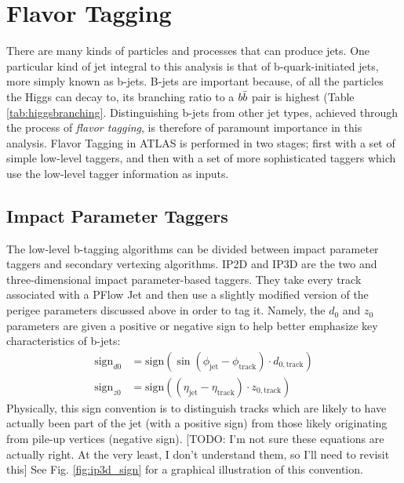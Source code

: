 
    \FloatBarrier
    \section{Flavor Tagging}
        
        There are many kinds of particles and processes that can produce jets.
        One particular kind of jet integral to this analysis is that of b-quark-initiated jets,
            more simply known as b-jets.
        B-jets are important because, of all the particles the Higgs can decay to,
            its branching ratio to a $b \bar{b}$ pair is highest (Table \ref{tab:higgsbranching}.
        Distinguishing b-jets from other jet types,
            achieved through the process of \textit{flavor tagging},
            is therefore of paramount importance in this analysis.
        Flavor Tagging in ATLAS is performed in two stages;
            first with a set of simple low-level taggers,
            and then with a set of more sophisticated taggers which use the low-level tagger information as inputs.


        \FloatBarrier
        \subsection{Impact Parameter Taggers}

            The low-level b-tagging algorithms can be divided between impact parameter taggers and secondary vertexing algorithms.
            IP2D and IP3D are the two and three-dimensional impact parameter-based taggers.
            They take every track associated with a PFlow Jet
                and then use a slightly modified version of the perigee parameters discussed above in order to tag it.
            Namely, the $d_0$ and $z_0$ parameters are given a positive or negative sign to help better emphasize key characteristics of b-jets\cite{thesis_giacinto}:
            \begin{equation} \begin{split}
                \textrm{sign}_{d0} &= \textrm{sign}(\sin(\phi_{\textrm{jet}} - \phi_{\textrm{track}}) \cdot d_{0,\textrm{track}}) \\
                \textrm{sign}_{z0} &= \textrm{sign}((\eta_{\textrm{jet}} - \eta_{\textrm{track}}) \cdot z_{0,\textrm{track}})
            \end{split} \end{equation}
            Physically, this sign convention is to distinguish tracks which are likely to have actually been part of the jet (with a positive sign)
                from those likely originating from pile-up vertices (negative sign).
            [TODO: I'm not sure these equations are actually right. At the very least, I don't understand them, so I'll need to revisit this]
            See Fig. \ref{fig:ip3d_sign} for a graphical illustration of this convention.

